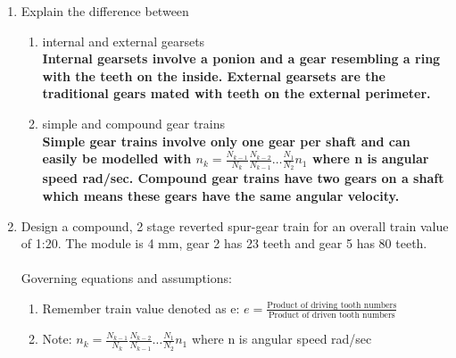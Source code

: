 \documentclass[11pt]{article}
\begin{document}
\begin{enumerate}
    \item Explain the difference between
    \begin{enumerate}
        \item internal and external gearsets
        \\
        \textbf{Internal gearsets involve a ponion and a gear resembling a ring with the teeth on the inside. External gearsets are the traditional gears mated with teeth on the external perimeter.}
        \item simple and compound gear trains
        \\
        \textbf{Simple gear trains involve only one gear per shaft and can easily be modelled with $n_k = \frac{N_{k-1}}{N_{k}} \frac{N_{k-2}}{N_{k-1}} \dots \frac{N_1}{N_2}n_1$ where n is angular speed rad/sec. Compound gear trains have two gears on a shaft which means these gears have the same angular velocity.}
    \end{enumerate}
    








    \item Design a compound, 2 stage reverted spur-gear train for an overall train value of 1:20. The
    module is 4 mm, gear 2 has 23 teeth and gear 5 has 80 teeth.
    \\~\\
    Governing equations and assumptions:
    \begin{enumerate}
        \item Remember train value denoted as e: $e = \frac{\text{Product of driving tooth numbers}}{\text{Product of driven tooth numbers}}$ 
        
        \item Note: $n_k = \frac{N_{k-1}}{N_{k}} \frac{N_{k-2}}{N_{k-1}} \dots \frac{N_1}{N_2}n_1$ where n is angular speed rad/sec
        

\end{enumerate}
\end{enumerate}
\end{document}
